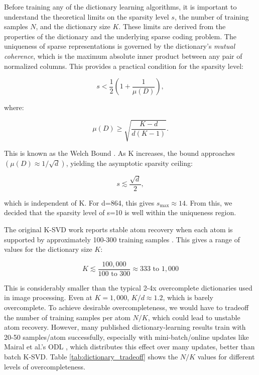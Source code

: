 Before training any of the dictionary learning algorithms, it is important to understand the theoretical limits on the
sparsity level $s$, the number of training samples $N$, and the dictionary size $K$. These limits are derived from the properties
of the dictionary and the underlying sparse coding problem. The uniqueness of sparse representations is governed by the
dictionary's \textit{mutual coherence}, which is the maximum absolute inner product between any pair of normalized columns.
This provides a practical condition for the sparsity level:

\begin{equation}[Sparsity Uniqueness Condition]
s < \frac{1}{2}\left(1+\frac{1}{\mu(D)}\right),
\end{equation}

\noindent where:

\begin{equation}[Welch Bound]
\mu(D) \ge \sqrt{\frac{K-d}{d(K-1)}}.
\end{equation}

This is known as the Welch Bound \citep{welch1974lower}. As K increases, the bound approaches $(\mu(D)\approx1/\sqrt{d})$,
yielding the asymptotic sparsity ceiling:

\begin{equation}[Asymptotic Sparsity Ceiling]
s \lesssim \frac{\sqrt{d}}{2},
\end{equation}

\noindent which is independent of K. For d=864, this gives $s_{\max}\approx14$.
From this, we decided that the sparsity level of s=10 is well within the uniqueness region.

The original K-SVD work reports stable atom recovery when each atom is supported by approximately 100-300 training samples
\citep{aharon2006ksvd}. This gives a range of values for the dictionary size $K$:

\begin{equation}[Dictionary Size Range]
K \lesssim \frac{100,000}{100 \text{ to } 300} \approx 333 \text{ to } 1,000
\end{equation}

This is considerably smaller than the typical 2-4x overcomplete dictionaries used in image processing. Even at $K=1,000$,
$K/d \approx 1.2$, which is barely overcomplete. To achieve desirable overcompleteness, we would have to tradeoff the
number of training samples per atom $N/K$, which could lead to unstable atom recovery. However, many published dictionary-learning
results train with 20-50 samples/atom successfully, especially with mini-batch/online updates like Mairal et al.'s ODL \cite{mairal2010online},
which distributes this effect over many updates, better than batch K-SVD. Table \ref{tab:dictionary_tradeoff} shows the $N/K$
values for different levels of overcompleteness.

